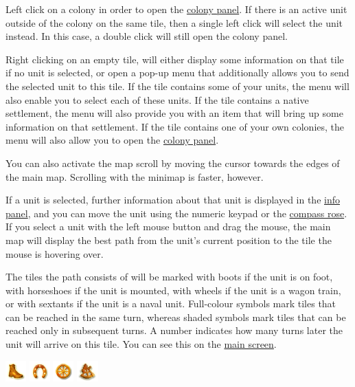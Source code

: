 \documentclass[12pt]{book}
\begin{document}
Left click on a colony in order to open the \hyperlink{colony
  panel}{colony panel}. If there is an active unit outside of the
colony on the same tile, then a single left click will select the unit
instead. In this case, a double click will still open the colony
panel.

Right clicking on an empty tile, will either display some information
on that tile if no unit is selected, or open a pop-up menu that
additionally allows you to send the selected unit to this tile. If the
tile contains some of your units, the menu will also enable you to
select each of these units. If the tile contains a native settlement,
the menu will also provide you with an item that will bring up some
information on that settlement. If the tile contains one of your own
colonies, the menu will also allow you to open the \hyperlink{colony
panel}{colony panel}.

You can also activate the map scroll by moving the cursor towards the
edges of the main map. Scrolling with the minimap is faster, however.

If a unit is selected, further information about that unit is
displayed in the \hyperlink{info panel}{info panel}, and you can move
the unit using the numeric keypad or the
\hyperlink{compass rose}{compass rose}. If you select a unit with the
left mouse button and drag the mouse, the main map will display the
best path from the unit's current position to the tile the mouse is
hovering over.

The tiles the path consists of will be marked with boots if the unit
is on foot, with horseshoes if the unit is mounted, with wheels if the
unit is a wagon train, or with sextants if the unit is a naval
unit. Full-colour symbols mark tiles that can be reached in the same
turn, whereas shaded symbols mark tiles that can be reached only in
subsequent turns. A number indicates how many turns later the unit
will arrive on this tile. You can see this on the \hyperlink{main
  screen}{main screen}.


  \begin{center}
    \includegraphics{images/path-foot.png}
    \includegraphics{images/path-horse.png}
    \includegraphics{images/path-wagon.png}
    \includegraphics{images/path-naval.png}
  \end{center}
\end{document}
